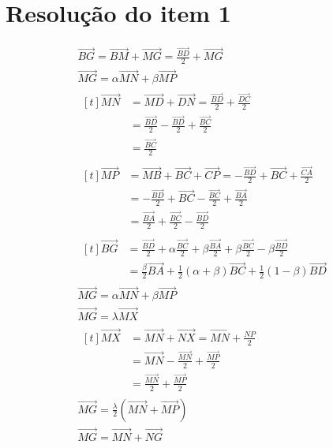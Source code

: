 \documentclass[brazilian, fleqn]{article}
\renewcommand{\vec}[1]{\overrightarrow{#1}}
\begin{document}
\section{Resolução do item 1}

\begin{gather}
    \vec{BG}= \vec{BM}+\vec{MG}=\frac{\vec{BD}}{2}+\vec{MG} \\
    \vec{MG}=\alpha \vec{MN}+\beta \vec{MP} \\
    \begin{aligned}[t]
        \vec{MN}&=\vec{MD}+\vec{DN} =\frac{\vec{BD}}{2}+\frac{\vec{DC}}{2} \\
                &=\frac{\vec{BD}}{2}-\frac{\vec{BD}}{2}+\frac{\vec{BC}}{2} \\
                &=\frac{\vec{BC}}{2}
    \end{aligned} \\
    \begin{aligned}[t]
        \vec{MP}&=\vec{MB}+\vec{BC}+\vec{CP}=-\frac{\vec{BD}}{2}+\vec{BC}+\frac{\vec{CA}}{2} \\
                &=-\frac{\vec{BD}}{2}+\vec{BC}-\frac{\vec{BC}}{2}+\frac{\vec{BA}}{2} \\
                &=\frac{\vec{BA}}{2}+\frac{\vec{BC}}{2}-\frac{\vec{BD}}{2}
    \end{aligned} \\
    \begin{aligned}[t]
        \vec{BG}&=\frac{\vec{BD}}{2}+\alpha \frac{\vec{BC}}{2}+\beta \frac{\vec{BA}}{2}+\beta \frac{\vec{BC}}{2}-\beta \frac{\vec{BD}}{2} \\
                &=\frac{\beta}{2}\vec{BA}+\frac{1}{2}(\alpha+\beta)\vec{BC}+\frac{1}{2}(1-\beta)\vec{BD}
    \end{aligned} \\
    \vec{MG}=\alpha \vec{MN}+\beta \vec{MP} \\
    \vec{MG}=\lambda \vec{MX} \\
    \begin{aligned}[t]
        \vec{MX}&=\vec{MN}+\vec{NX}=\vec{MN}+\frac{NP}{2}\\
                &=\vec{MN}-\frac{\vec{MN}}{2}+\frac{\vec{MP}}{2} \\
                &=\frac{\vec{MN}}{2}+\frac{\vec{MP}}{2}
    \end{aligned} \\
    \vec{MG}=\frac{\lambda}{2}(\vec{MN}+\vec{MP})\\
    \vec{MG}=\vec{MN}+\vec{NG} \\

\end{gather}
\end{document}
